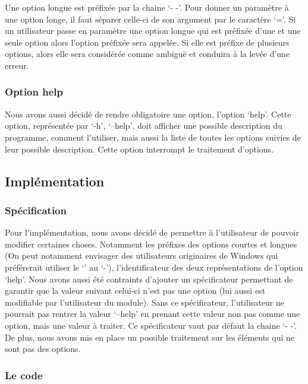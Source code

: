 \documentclass[12pt]{article}
\begin{document}
    Une option longue est préfixée par la chaine `- -'. Pour donner un paramètre 
    à une option longe, il faut séparer celle-ci de son argument par le 
    caractère `='. Si un utilisateur passe en paramètre une option longue qui 
    est préfixée d'une et une seule option alors l'option préfixée sera appelée. 
    Si elle est préfixe de plusieurs options, alors elle sera considérée comme 
    ambiguë et conduira à la levée d'une erreur.

    \subsubsection{Option help}

    Nous avons aussi décidé de rendre obligatoire une option, l'option `help'.
    Cette option, représentée par `-h', `--help', doit afficher une possible 
    description du programme, comment l'utiliser, mais aussi la liste de toutes 
    les options suivies de leur possible description. Cette option interrompt le 
    traitement d'options. 

    \subsection{Implémentation}

    \subsubsection{Spécification}

    Pour l'implémentation, nous avons décidé de permettre à l'utilisateur de 
    pouvoir modifier certaines choses. Notamment les préfixes des options 
    courtes et longues (On peut notamment envisager des utilisateurs originaires 
    de Windows qui préférerait utiliser le `' au `-'), 
    l'identificateur des deux représentations de l'option `help'. Nous avons 
    aussi été contraints d'ajouter un spécificateur permettant de garantir que 
    la valeur suivant celui-ci n'est pas une option (lui aussi est modifiable 
    par l'utilisateur du module). Sans ce spécificateur, l'utilisateur ne 
    pourrait pas rentrer la valeur `--help' en prenant cette valeur non pas 
    comme une option, mais une valeur à traiter. Ce spécificateur vaut par 
    défaut la chaine `- -'. De plus, nous avons mis en place un possible 
    traitement sur les éléments qui ne sont pas des options.
    
    \subsubsection{Le code}
\end{document}

